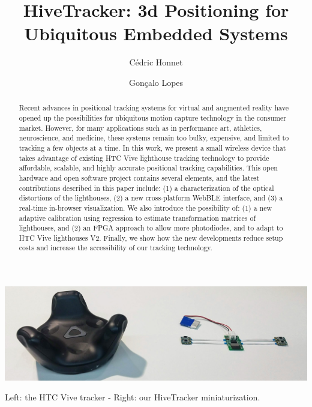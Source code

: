 \documentclass[sigchi]{acmart}
\begin{document}
\title{HiveTracker: 3d Positioning for Ubiquitous Embedded Systems}

\author{C\'edric Honnet}

\author{Gon\c{c}alo Lopes}

\begin{teaserfigure}
\centering
\includegraphics[width=1.0\columnwidth]{Figures/banner.jpg}
\caption{Left: the HTC Vive tracker - Right: our HiveTracker miniaturization.}
\label{Fig:Banner}
\end{teaserfigure}

\begin{abstract}
Recent advances in positional tracking systems for virtual and augmented reality have opened up the possibilities for ubiquitous motion capture technology in the consumer market. However, for many applications such as in performance art, athletics, neuroscience, and medicine, these systems remain too bulky, expensive, and limited to tracking a few objects at a time. In this work, we present a small wireless device that takes advantage of existing HTC Vive lighthouse tracking technology to provide affordable, scalable, and highly accurate positional tracking capabilities. This open hardware and open software project contains several elements, and the latest contributions described in this paper include: (1) a characterization of the optical distortions of the lighthouses, (2) a new cross-platform WebBLE interface, and (3) a real-time in-browser visualization. We also introduce the possibility of: (1) a new adaptive calibration using regression to estimate transformation matrices of lighthouses, and (2) an FPGA approach to allow more photodiodes, and to adapt to HTC Vive lighthouses V2. Finally, we show how the new developments reduce setup costs and increase the accessibility of our tracking technology.
\end{abstract}
\end{document}
